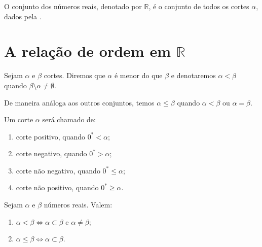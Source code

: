 \documentclass[../main.tex]{subfiles}
\begin{document}
\begin{defi}
    O conjunto dos números reais, denotado por $\mathbb{R}$, é o conjunto de todos os cortes $\alpha$, dados pela .
\end{defi}

\section{A relação de ordem em $\mathbb{R}$}

\begin{defi}\label{reais-def-relacaoOrdem}
    Sejam $\alpha$ e $\beta$ cortes. Diremos que $\alpha$ é menor do que $\beta$ e denotaremos $\alpha < \beta$ quando $\beta \setminus \alpha \neq \emptyset$.
\end{defi}
\begin{obs}
    De maneira análoga aos outros conjuntos, temos $\alpha \leq \beta$ quando $\alpha < \beta$ ou $\alpha = \beta$.
\end{obs}
\begin{defi}
    Um corte $\alpha$ será chamado de:
    \begin{enumerate}[label=(\roman*)]
        \item corte positivo, quando $0^* < \alpha$;
        \item corte negativo, quando $0^* > \alpha$;
        \item corte não negativo, quando $0^* \leq \alpha$;
        \item corte não positivo, quando $0^* \geq \alpha$.
    \end{enumerate}
\end{defi}

\begin{teo}\label{reais-teo-subset}
    Sejam $\alpha$ e $\beta$ números reais. Valem:
    \begin{enumerate}[label=(\roman*)]
        \item $\alpha < \beta \iff \alpha \subset \beta$ e $\alpha \neq \beta$;
        \item $\alpha \leq \beta \iff \alpha \subset \beta$.
    \end{enumerate}
\end{teo}
\end{document}
